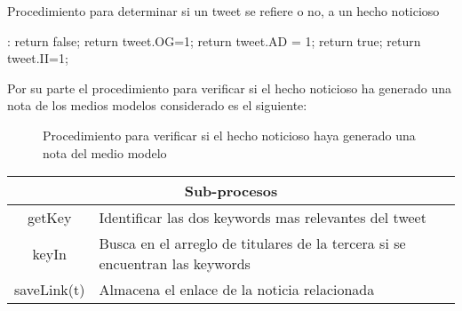 \begin{algorithm}[H]
	\caption{Procedimiento para determinar si un tweet se refiere o no, a un hecho noticioso}
	\label{ifNoticia}
	\begin{algorithmic}[1]
		
		:
		\State return false;
		\Else
		\State return tweet.OG=1;
		\Else
		\State return tweet.AD = 1;
		\Else
		\State return true;
		\EndIf
		\Else
		\State return tweet.II=1;
		\EndIf
		\EndIf
		\EndIf
		\EndFunction
	\end{algorithmic}
\end{algorithm}	

Por su parte el procedimiento para verificar si el hecho noticioso ha generado una nota de los medios modelos considerado es el siguiente:

\begin{figure}[H]
\begin{center}
	\caption{Procedimiento para verificar si el hecho noticioso haya generado una nota del medio modelo}
	\label{fig:haveLink}
\end{center}
\end{figure}

\begin{center}
	\begin{tabular}{|c|l|}
		\hline
		\multicolumn{2}{|c|}{\textbf{Sub-procesos}} \\ \hline
		getKey & Identificar las dos keywords mas relevantes del tweet\\ \hline
		keyIn  & Busca en el arreglo de titulares de la tercera si se encuentran las keywords \\              \hline
		saveLink(t) & Almacena el enlace de la noticia relacionada \\ \hline
	\end{tabular}
\end{center}

